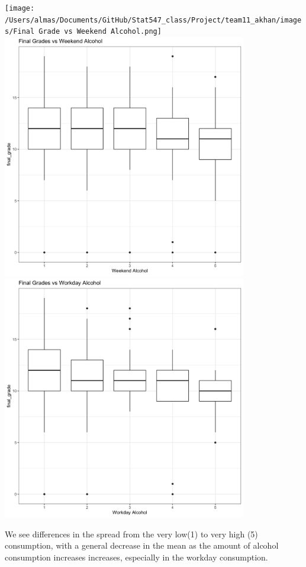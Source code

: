 \documentclass[]{article}
\begin{document}
\texttt{[image: /Users/almas/Documents/GitHub/Stat547\_class/Project/team11\_akhan/images/Final Grade vs Weekend Alcohol.png]}
\includegraphics[width=0.8\textwidth,height=\textheight]{images/Final Grade vs Weekend Alcohol.png}~\includegraphics[width=0.8\textwidth,height=\textheight]{images/Final Grade vs Workday Alcohol.png}

We see differences in the spread from the very low(1) to very high (5)
consumption, with a general decrease in the mean as the amount of
alcohol consumption increases increases, especially in the workday
consumption.
\end{document}
